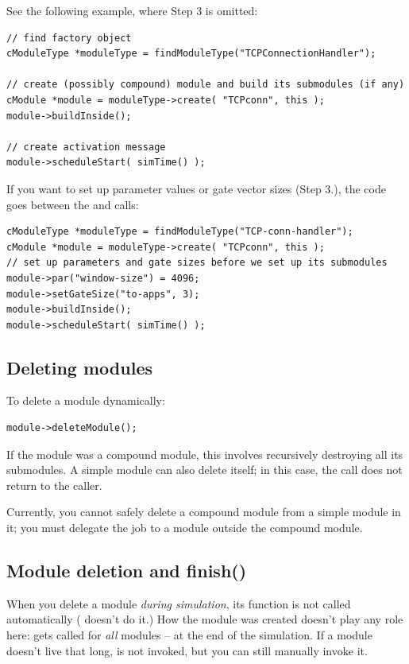 See the following example, where Step 3 is omitted:

\begin{verbatim}
// find factory object
cModuleType *moduleType = findModuleType("TCPConnectionHandler");

// create (possibly compound) module and build its submodules (if any)
cModule *module = moduleType->create( "TCPconn", this );
module->buildInside();

// create activation message
module->scheduleStart( simTime() );
\end{verbatim}

If you want to set up parameter values or gate vector sizes (Step 3.),
the code goes between the  and
 calls:

\begin{verbatim}
cModuleType *moduleType = findModuleType("TCP-conn-handler");
cModule *module = moduleType->create( "TCPconn", this );
// set up parameters and gate sizes before we set up its submodules
module->par("window-size") = 4096;
module->setGateSize("to-apps", 3);
module->buildInside();
module->scheduleStart( simTime() );
\end{verbatim}


\subsection{Deleting modules}


To delete a module dynamically:

\begin{verbatim}
module->deleteModule();
\end{verbatim}

If the module was a compound module, this involves recursively
destroying all its submodules. A simple module can also delete itself;
in this case, the  call does not return to the
caller.

Currently, you cannot safely delete a
compound module from a simple module
in it; you must delegate the job to a module outside the compound
module.


\subsection{Module deletion and finish()}

When you delete a module \textit{during simulation}, its 
function is not called automatically ( doesn't do it.)
How the module was created doesn't play any role here:
 gets called for \textit{all} modules -- at the end of the
simulation. If a module doesn't live that long,  is not
invoked, but you can still manually invoke it.

